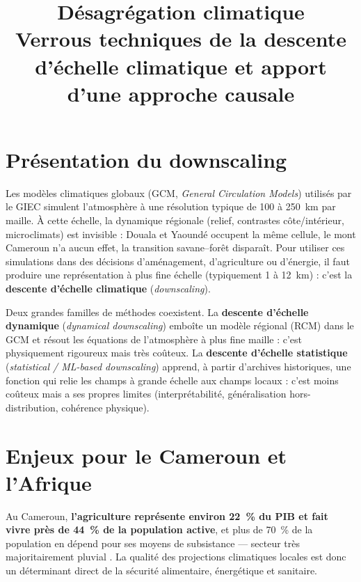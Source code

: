 \documentclass[12pt,a4paper]{article}
\title{\vspace{-2em}\Large\bfseries Désagrégation climatique\\[2pt]
\large Verrous techniques de la descente d'échelle climatique et apport d'une approche causale}
\author{}
\date{}
\begin{document}
\maketitle
\vspace{-3em}

\section{Présentation du downscaling}

Les modèles climatiques globaux (GCM, \emph{General Circulation Models}) utilisés par le GIEC simulent l'atmosphère à une résolution typique de 100 à 250~km par maille. À cette échelle, la dynamique régionale (relief, contrastes côte/intérieur, microclimats) est invisible : Douala et Yaoundé occupent la même cellule, le mont Cameroun n'a aucun effet, la transition savane--forêt disparaît. Pour utiliser ces simulations dans des décisions d'aménagement, d'agriculture ou d'énergie, il faut produire une représentation à plus fine échelle (typiquement 1 à 12~km) : c'est la \textbf{descente d'échelle climatique} (\emph{downscaling}).

Deux grandes familles de méthodes coexistent. La \textbf{descente d'échelle dynamique} (\emph{dynamical downscaling}) emboîte un modèle régional (RCM) dans le GCM et résout les équations de l'atmosphère à plus fine maille : c'est physiquement rigoureux mais très coûteux. La \textbf{descente d'échelle statistique} (\emph{statistical / ML-based downscaling}) apprend, à partir d'archives historiques, une fonction qui relie les champs à grande échelle aux champs locaux : c'est moins coûteux mais a ses propres limites (interprétabilité, généralisation hors-distribution, cohérence physique).

\section{Enjeux pour le Cameroun et l'Afrique}

Au Cameroun, \textbf{l'agriculture représente environ 22~\% du PIB et fait vivre près de 44~\% de la population active}, et plus de 70~\% de la population en dépend pour ses moyens de subsistance --- secteur très majoritairement pluvial \cite{IMF2024,WB2022CCDR}. La qualité des projections climatiques locales est donc un déterminant direct de la sécurité alimentaire, énergétique et sanitaire.
\end{document}
